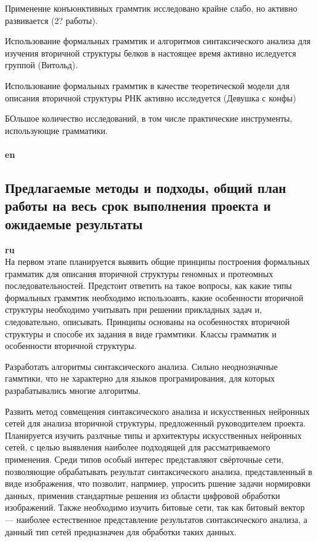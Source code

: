 \documentclass[12pt]{article}  %
\theoremstyle{remark}
\begin{document}
Применение конъюнктивных граммтик исследовано крайне слабо, но активно развивается (2? работы).

Использование формальных граммтик и алгоритмов синтаксического анализа для изучения вторичной структуры белков в настоящее время активно иследуется группой (Витольд).

Использование формальных граммтик в качестве теоретической модели для описания вторичной структуры РНК активно исследуется (Девушка с конфы)

БОльшое количество исследований, в том числе практические инструменты, использующие грамматики.
\\
\\
\textbf{en}\\



\subsection{Предлагаемые методы и подходы, общий план работы на весь срок выполнения проекта и ожидаемые результаты }

\textbf{ru}\\
На первом этапе планируется выявить общие принципы построения формальных грамматик для описания вторичной структуры геномных и протеомных последовательностей. Предстоит ответить на такое вопросы, как какие типы формальных граммтик необходимо использоавть, какие особенности вторичной структуры необходимо учитывать при решении прикладных задач и, следовательно, описывать.
Принципы основаны на особенностях вторичной структуры и способе их задания в виде граммтики.
Классы грамматик и особенности вторичной структуры.

Разработать алгоритмы синтаксического анализа.
Сильно неоднозначные гаммтики, что не характерно для языков програмирования, для которых разрабатывались многие алгоритмы.

Развить метод совмещения синтаксического анализа и искусственных нейронных сетей для анализа вторичной структуры, предложенный руководителем проекта.
Планируется изучить разлчные типы и архитектуры искусственных нейронных сетей, с целью выявления наиболее подходящей для рассматриваемого применения.
Среди типов особый интерес представляют свёрточные сети, позволяющие обрабатывать результат синтаксического анализа, представленный в виде изображения, что позволит, напрмиер, упросить ршение задачи нормировки данных, применив стандартные решения из области цифровой обработки изображений.
Также необходимо изучить битовые сети, так как битовый вектор --- наиболее естественное представление результатов синтаксического анализа, а данный тип сетей предназначен для обработки таких данных.
\end{document}
